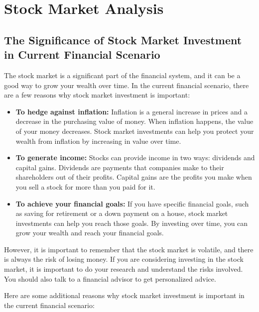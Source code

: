 \chapter{Stock Market Analysis}
\section{The Significance of Stock Market Investment in Current Financial Scenario}

The stock market is a significant part of the financial system, and it can be a good way to grow your wealth over time. In the current financial scenario, there are a few reasons why stock market investment is important:

\begin{itemize}
\item \textbf{To hedge against inflation:} Inflation is a general increase in prices and a decrease in the purchasing value of money. When inflation happens, the value of your money decreases. Stock market investments can help you protect your wealth from inflation by increasing in value over time.
\item \textbf{To generate income:} Stocks can provide income in two ways: dividends and capital gains. Dividends are payments that companies make to their shareholders out of their profits. Capital gains are the profits you make when you sell a stock for more than you paid for it.
\item \textbf{To achieve your financial goals:} If you have specific financial goals, such as saving for retirement or a down payment on a house, stock market investments can help you reach those goals. By investing over time, you can grow your wealth and reach your financial goals.
\end{itemize}

However, it is important to remember that the stock market is volatile, and there is always the risk of losing money. If you are considering investing in the stock market, it is important to do your research and understand the risks involved. You should also talk to a financial advisor to get personalized advice.

Here are some additional reasons why stock market investment is important in the current financial scenario:

